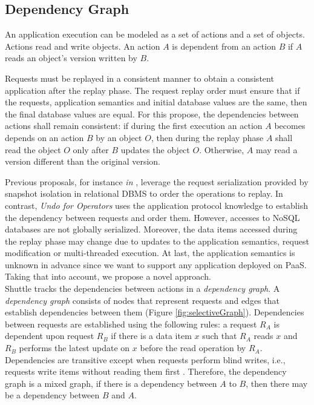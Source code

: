 \subsection{Dependency Graph}
\label{sec:arch:dependencies}
An application execution can be modeled as a set of actions and a set of objects. Actions read and write objects. An action $A$ is dependent from an action $B$ if $A$ reads an object's version written by $B$.

Requests must be replayed in a consistent manner to obtain a consistent application after the replay phase. The request replay order must ensure that if the requests, application semantics and initial database values are the same, then the final database values are equal. For this propose, the dependencies between actions shall remain consistent: if during the first execution an action $A$ becomes depends on an action $B$ by an object $O$, then during the replay phase $A$ shall read the object $O$ only after $B$ updates the object $O$. Otherwise, $A$ may read a version different than the original version.

Previous proposals, for instance \emph{in} \cite{goel}, leverage the request serialization provided by snapshot isolation in relational \ac{DBMS} to order the operations to replay. In contrast, \textit{Undo for Operators} \cite{undoForOperators} uses the application protocol knowledge to establish the dependency between requests and order them. However, accesses to \acs{NoSQL} databases are not globally serialized. Moreover, the data items accessed during the replay phase may change due to updates to the application semantics, request modification or multi-threaded execution. At last, the application semantics is unknown in advance since we want to support any application deployed on \ac{PaaS}. Taking that into account, we propose a novel approach.\\


Shuttle tracks the dependencies between actions in a \textit{dependency graph}. A \emph{dependency graph} consists of nodes that represent requests and edges that establish dependencies between them (Figure \ref{fig:selectiveGraph}).  Dependencies between requests are established using the following rules: a request $R_A$ is dependent upon request $R_B$ if there is a data item $x$ such that $R_A$ reads $x$ and $R_B$ performs the latest update on $x$ before the read operation by $R_A$. Dependencies are transitive except when requests perform blind writes, i.e., requests write items without reading them first \cite{Ammann2002}. Therefore, the dependency graph is a mixed graph, if there is a dependency between $A$ to $B$, then there may be a dependency between $B$ and $A$.


